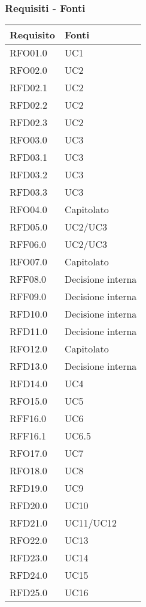 \subsubsection{Requisiti - Fonti}
{
    \setlength{\freewidth}{\dimexpr\textwidth-8\tabcolsep}
    \renewcommand{\arraystretch}{1.5}
    \centering
    \setlength{\aboverulesep}{0pt}
    \setlength{\belowrulesep}{0pt}
    \begin{longtable}{C{.50\freewidth} C{.50\freewidth}}
        \toprule 
        \textbf{Requisito} & \textbf{Fonti} \\
        \toprule
        \endhead

        RFO01.0  & UC1 \\
        RFO02.0  & UC2 \\
        RFD02.1  & UC2 \\
        RFD02.2  & UC2 \\
        RFD02.3  & UC2 \\
        RFO03.0  & UC3 \\
        RFD03.1  & UC3 \\
        RFD03.2  & UC3 \\
        RFD03.3  & UC3 \\
        RFO04.0  & Capitolato \\
        RFD05.0  & UC2/UC3 \\
        RFF06.0  & UC2/UC3 \\
        RFO07.0  & Capitolato \\
        RFF08.0  & Decisione interna \\
        RFF09.0  & Decisione interna \\
        RFD10.0  & Decisione interna \\
        RFD11.0  & Decisione interna \\
        RFO12.0  & Capitolato \\
        RFD13.0  & Decisione interna \\

        RFD14.0  & UC4 \\
        RFO15.0  & UC5 \\
        RFF16.0  & UC6 \\
        RFF16.1  & UC6.5 \\
        RFO17.0  & UC7 \\
        RFO18.0  & UC8 \\
        RFD19.0  & UC9 \\
        RFD20.0  & UC10 \\
        RFD21.0  & UC11/UC12 \\
        RFO22.0  & UC13 \\
        RFD23.0  & UC14 \\
        RFD24.0  & UC15 \\
        RFD25.0  & UC16 \\


\end{longtable}}
